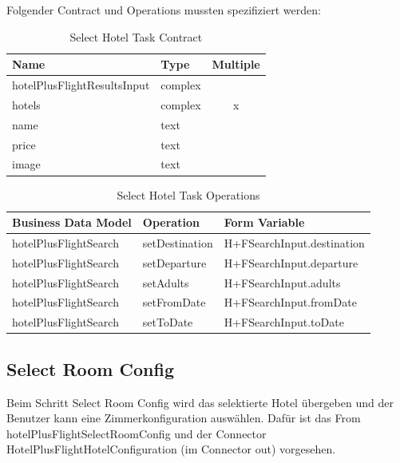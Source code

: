 Folgender Contract und Operations mussten spezifiziert werden:
\begin{table}[H] 
	\caption{Select Hotel Task Contract}
	\centering
	
	\begin{tabular}{ | l | l | c | } 
		\hline
		\textbf{Name} & \textbf{Type} & \textbf{Multiple} \\ \hline 
		hotelPlusFlightResultsInput & complex & \\ \hline
		\hspace*{5mm}hotels & complex & x \\ \hline
		\hspace*{10mm}name & text & \\ \hline
		\hspace*{10mm}price & text & \\ \hline
		\hspace*{10mm}image & text & \\ \hline
	\end{tabular} 
\end{table}
\begin{table}[H] 
	\caption{Select Hotel Task Operations}
	\centering
	
	\begin{tabular}{ | l | l | l | } 
		\hline
		\textbf{Business Data Model} & \textbf{Operation} & \textbf{Form Variable} \\ \hline 
		hotelPlusFlightSearch & setDestination & H+FSearchInput.destination \\ \hline
		hotelPlusFlightSearch & setDeparture & H+FSearchInput.departure \\ \hline
		hotelPlusFlightSearch & setAdults & H+FSearchInput.adults \\ \hline
		hotelPlusFlightSearch & setFromDate & H+FSearchInput.fromDate \\ \hline
		hotelPlusFlightSearch & setToDate & H+FSearchInput.toDate \\ \hline
	\end{tabular} 
\end{table}

\subsection{Select Room Config}
Beim Schritt Select Room Config wird das selektierte Hotel übergeben und der Benutzer kann eine Zimmerkonfiguration auswählen. Dafür ist das From hotelPlusFlightSelectRoomConfig und der Connector HotelPlusFlightHotelConfiguration (im Connector out) vorgesehen.

